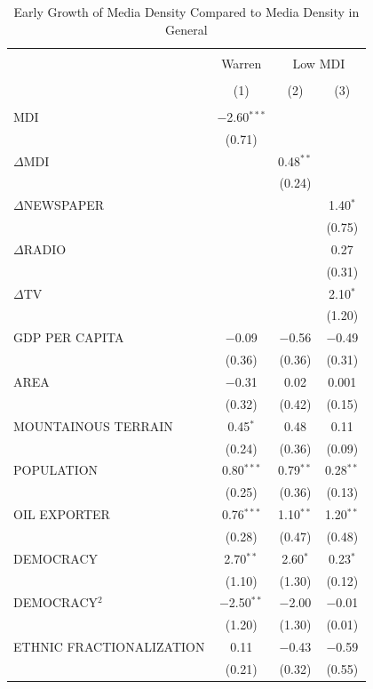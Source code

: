 \documentclass[11pt,article,oneside]{memoir}
\begin{document}
\begin{table}[!htbp] \centering 
  \caption{Early Growth of Media Density Compared to Media Density in General} 
  \label{} 
\footnotesize 
\begin{tabular}{@{\extracolsep{5pt}}lccc} 
\\[-1.8ex]\hline \\[-1.8ex] 
 & Warren & \multicolumn{2}{c}{Low MDI} \\ 
\\[-1.8ex] & (1) & (2) & (3)\\ 
\hline \\[-1.8ex] 
 MDI & $-$2.60$^{***}$ &  &  \\ 
  & (0.71) &  &  \\ 
  $\Delta$MDI &  & 0.48$^{**}$ &  \\ 
  &  & (0.24) &  \\ 
  $\Delta$NEWSPAPER &  &  & 1.40$^{*}$ \\ 
  &  &  & (0.75) \\ 
  $\Delta$RADIO &  &  & 0.27 \\ 
  &  &  & (0.31) \\ 
  $\Delta$TV &  &  & 2.10$^{*}$ \\ 
  &  &  & (1.20) \\ 
  GDP PER CAPITA & $-$0.09 & $-$0.56 & $-$0.49 \\ 
  & (0.36) & (0.36) & (0.31) \\ 
  AREA & $-$0.31 & 0.02 & 0.001 \\ 
  & (0.32) & (0.42) & (0.15) \\ 
  MOUNTAINOUS TERRAIN & 0.45$^{*}$ & 0.48 & 0.11 \\ 
  & (0.24) & (0.36) & (0.09) \\ 
  POPULATION & 0.80$^{***}$ & 0.79$^{**}$ & 0.28$^{**}$ \\ 
  & (0.25) & (0.36) & (0.13) \\ 
  OIL EXPORTER & 0.76$^{***}$ & 1.10$^{**}$ & 1.20$^{**}$ \\ 
  & (0.28) & (0.47) & (0.48) \\ 
  DEMOCRACY & 2.70$^{**}$ & 2.60$^{*}$ & 0.23$^{*}$ \\ 
  & (1.10) & (1.30) & (0.12) \\ 
  DEMOCRACY$^2$ & $-$2.50$^{**}$ & $-$2.00 & $-$0.01 \\ 
  & (1.20) & (1.30) & (0.01) \\ 
  ETHNIC FRACTIONALIZATION & 0.11 & $-$0.43 & $-$0.59 \\ 
  & (0.21) & (0.32) & (0.55) \\ 

\end{tabular}
\end{table}
\end{document}
